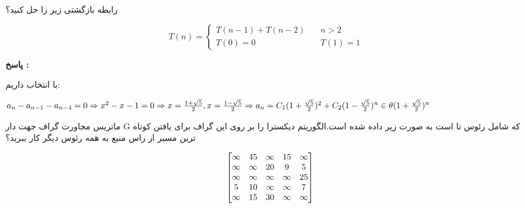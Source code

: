\documentclass[11pt,a4paper]{exam}
\theoremstyle{definition}
\begin{document}
\begin{questions}
\question
رابطه بازگشتی زیر را حل کنید؟


\begin{latin}
\[ T(n) =
  \begin{cases}
   T(n-1)+T(n-2)       & \quad n>2\\
    T(0)=0  & \quad T(1)=1
  \end{cases}
\]
\end{latin}
\begin{flushright}
\textbf{\color{red}پاسخ :}
\end{flushright}
با انتخاب  داریم:


\begin{latin}

{$
a_{n} - a_{n-1} - a_{n-4}=0\Rightarrow x^{2}-x-1=0 
\Rightarrow x=\frac {1+\sqrt5}{2} , x=\frac {1-\sqrt5}{2} \Rightarrow\\  
a_n=C_1(1+\frac{\sqrt5}{2})^2 + C_2(1-\frac{\sqrt5}{2})^n \in \theta(1+\frac{\sqrt5}{2})^n
$}
\end{latin}
\vspace*{1in}


\question
\vspace{0.5in}

\question
ماتریس مجاورت گراف جهت دار G که شامل رئوس  تا  است به صورت زیر داده شده است.الگوریتم دیکسترا را بر روی این گراف برای یافتن کوتاه ترین مسیر از راس منبع  به همه رئوس دیگر کار ببرید؟

\begin{latin}
\[
\begin{array}{lc}
  \verb|| & \begin{bmatrix}
                    \infty & 45 & \infty & 15 & \infty \\
                    \infty & \infty & 20 & 9 & 5 \\
                    \infty & \infty & \infty & \infty & 25 \\
                           5 & 10 & \infty & \infty & 7 \\
                    \infty & 15 & 30 & \infty & \infty
                  \end{bmatrix} \\[15pt]
\end{array}
\]
\end{latin}


\end{questions}
\end{document}
